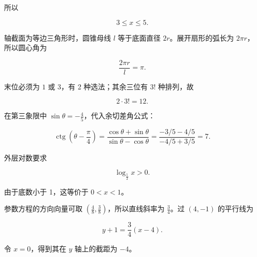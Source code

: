 \begin{answer}
所以

\nopagebreak[4]
\[
3\le x\le5.
\]


轴截面为等边三角形时，圆锥母线 $l$ 等于底面直径 $2r$。展开扇形的弧长为 $2\pi r$，所以圆心角为

\nopagebreak[4]
\[
\frac{2\pi r}{l}=\pi.
\]


末位必须为 $1$ 或 $3$，有 2 种选法；其余三位有 $3!$ 种排列，故

\nopagebreak[4]
\[
2\cdot3!=12.
\]


在第三象限中 $\sin\theta=-\frac45$，代入余切差角公式：

\nopagebreak[4]
\[
\operatorname{ctg}\left(\theta-\frac\pi4\right)
=\frac{\cos\theta+\sin\theta}{\sin\theta-\cos\theta}
=\frac{-3/5-4/5}{-4/5+3/5}=7.
\]


外层对数要求

\nopagebreak[4]
\[
\log_{\frac12}x>0.
\]

由于底数小于 1，这等价于 $0<x<1$。


参数方程的方向向量可取 $\left(\frac48,\frac38\right)$，所以直线斜率为 $\frac34$。过 $(4,-1)$ 的平行线为

\nopagebreak[4]
\[
y+1=\frac34(x-4).
\]

令 $x=0$，得到其在 $y$ 轴上的截距为 $-4$。











\end{answer}
